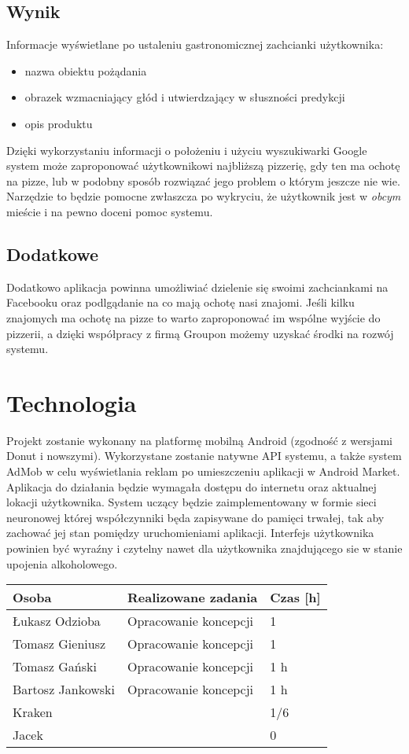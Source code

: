 \documentclass[a4paper,twoside,11pt]{article}
\begin{document}
\subsection{Wynik}
Informacje wyświetlane po ustaleniu gastronomicznej zachcianki użytkownika:
\begin{itemize}
\item nazwa obiektu pożądania
\item obrazek wzmacniający głód i utwierdzający w słuszności predykcji
\item opis produktu
\end{itemize}
Dzięki wykorzystaniu informacji o położeniu i użyciu wyszukiwarki Google system może zaproponować użytkownikowi
najbliższą pizzerię, gdy ten ma ochotę na pizze, lub w podobny sposób rozwiązać jego problem o którym jeszcze nie wie. Narzędzie to będzie pomocne zwłaszcza po wykryciu, że użytkownik jest w \emph{obcym} mieście
i na pewno doceni pomoc systemu.
\subsection{Dodatkowe}
Dodatkowo aplikacja powinna umożliwiać dzielenie się swoimi zachciankami na Facebooku oraz podlgądanie na co mają ochotę nasi znajomi.
Jeśli kilku znajomych ma ochotę na pizze to warto zaproponować im wspólne wyjście do pizzerii, a dzięki współpracy z firmą Groupon możemy uzyskać środki na rozwój systemu.
\section{Technologia}
Projekt zostanie wykonany na platformę mobilną Android (zgodność z wersjami Donut i nowszymi). Wykorzystane zostanie natywne API systemu, a także system AdMob w celu wyświetlania reklam po umieszczeniu aplikacji w Android Market. Aplikacja do działania będzie wymagała dostępu do internetu oraz aktualnej lokacji użytkownika.
System uczący będzie zaimplementowany w formie sieci neuronowej której współczynniki będa zapisywane do pamięci trwałej, tak aby zachować jej stan pomiędzy uruchomieniami aplikacji.
Interfejs użytkownika powinien być wyraźny i czytelny nawet dla użytkownika znajdującego sie w stanie upojenia alkoholowego.
\begin{center}
\begin{tabular}{|l|p{11cm}|l|}
  \hline 
  Osoba & Realizowane zadania & Czas [h]\\
  \hline
  Łukasz Odzioba & Opracowanie koncepcji & 1 \\
 \hline
  Tomasz Gieniusz & Opracowanie koncepcji & 1 \\
 \hline
  Tomasz Gański & Opracowanie koncepcji & 1 h\\
 \hline 
  Bartosz Jankowski & Opracowanie koncepcji & 1 h \\
 \hline
  Kraken &  & 1/6 \\
 \hline
  Jacek &  & 0 \\
 \hline
\end{tabular} 
\end{center}
\end{document}
